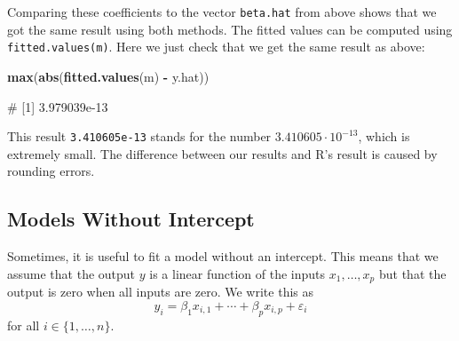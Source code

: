 \documentclass[
  a4paper,
]{article}
\newenvironment{Shaded}{\begin{snugshade}}{\end{snugshade}}
\newcommand{\FunctionTok}[1]{\textcolor[rgb]{0.13,0.29,0.53}{\textbf{#1}}}
\newcommand{\NormalTok}[1]{#1}
\newcommand{\SpecialCharTok}[1]{\textcolor[rgb]{0.81,0.36,0.00}{\textbf{#1}}}
\theoremstyle{definition}
\theoremstyle{definition}
\theoremstyle{definition}
\theoremstyle{definition}
\theoremstyle{remark}
\begin{document}
Comparing these coefficients to the vector \texttt{beta.hat} from above shows
that we got the same result using both methods. The fitted values
can be computed using \texttt{fitted.values(m)}. Here we just check that we get
the same result as above:

\begin{Shaded}
\begin{Highlighting}[]
\FunctionTok{max}\NormalTok{(}\FunctionTok{abs}\NormalTok{(}\FunctionTok{fitted.values}\NormalTok{(m) }\SpecialCharTok{{-}}\NormalTok{ y.hat))}
\end{Highlighting}
\end{Shaded}

\begin{Shaded}
\begin{Highlighting}[]
\NormalTok{\# [1] 3.979039e{-}13}
\end{Highlighting}
\end{Shaded}

This result \texttt{3.410605e-13} stands for the number \(3.410605 \cdot 10^{-13}\),
which is extremely small. The difference between our results and R's result
is caused by rounding errors.

\subsection{Models Without Intercept}\label{models-without-intercept}

Sometimes, it is useful to fit a model without an intercept. This
means that we assume that the output \(y\) is a linear function of the
inputs \(x_1, \ldots, x_p\) but that the output is zero when all inputs
are zero. We write this as
\begin{equation*}
  y_i
  = \beta_1 x_{i,1} + \cdots + \beta_p x_{i,p} + \varepsilon_i
\end{equation*}
for all \(i \in \{1, \ldots, n\}\).
\end{document}
